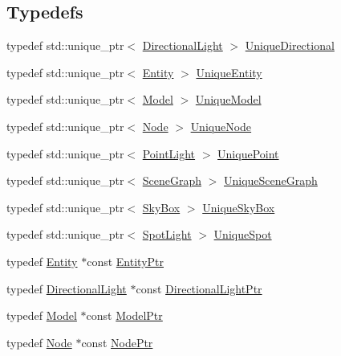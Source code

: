 \subsection*{Typedefs}
\begin{DoxyCompactItemize}
\item 
typedef std\+::unique\+\_\+ptr$<$ \hyperlink{structLarp_1_1DirectionalLight}{Directional\+Light} $>$ \hyperlink{namespaceLarp_af87ce889468b60d51aa1479335ba19bf}{Unique\+Directional}
\item 
typedef std\+::unique\+\_\+ptr$<$ \hyperlink{classLarp_1_1Entity}{Entity} $>$ \hyperlink{namespaceLarp_ad6d203c6dc3d8ea7a5517a64e1665403}{Unique\+Entity}
\item 
typedef std\+::unique\+\_\+ptr$<$ \hyperlink{classLarp_1_1Model}{Model} $>$ \hyperlink{namespaceLarp_a6e9a93e4118b723d56766c7ae7e1e94a}{Unique\+Model}
\item 
typedef std\+::unique\+\_\+ptr$<$ \hyperlink{classLarp_1_1Node}{Node} $>$ \hyperlink{namespaceLarp_ad95a88bc34f8c78cefd64c9bbeb94a58}{Unique\+Node}
\item 
typedef std\+::unique\+\_\+ptr$<$ \hyperlink{structLarp_1_1PointLight}{Point\+Light} $>$ \hyperlink{namespaceLarp_acd7cacff15535544525abc2e90e07b91}{Unique\+Point}
\item 
typedef std\+::unique\+\_\+ptr$<$ \hyperlink{classLarp_1_1SceneGraph}{Scene\+Graph} $>$ \hyperlink{namespaceLarp_a81a0d129ec1fc8f1f9fa231fbba6b19b}{Unique\+Scene\+Graph}
\item 
typedef std\+::unique\+\_\+ptr$<$ \hyperlink{classLarp_1_1SkyBox}{Sky\+Box} $>$ \hyperlink{namespaceLarp_a9acaa85c01aee19dafa995b4eba59bd0}{Unique\+Sky\+Box}
\item 
typedef std\+::unique\+\_\+ptr$<$ \hyperlink{structLarp_1_1SpotLight}{Spot\+Light} $>$ \hyperlink{namespaceLarp_a288b58c470c3ed41d3b23e764ba5b6eb}{Unique\+Spot}
\item 
typedef \hyperlink{classLarp_1_1Entity}{Entity} $\ast$const \hyperlink{namespaceLarp_a775efcc4cabb308d50168c52df343353}{Entity\+Ptr}
\item 
typedef \hyperlink{structLarp_1_1DirectionalLight}{Directional\+Light} $\ast$const \hyperlink{namespaceLarp_a38725e08be7b2ebb94f5f71eb0f0c692}{Directional\+Light\+Ptr}
\item 
typedef \hyperlink{classLarp_1_1Model}{Model} $\ast$const \hyperlink{namespaceLarp_a1fbc1dec59f7a571dc06e152b1e7d38c}{Model\+Ptr}
\item 
typedef \hyperlink{classLarp_1_1Node}{Node} $\ast$const \hyperlink{namespaceLarp_a171c1dc8b70cfb441b15d7386780db23}{Node\+Ptr}

\end{DoxyCompactItemize}
